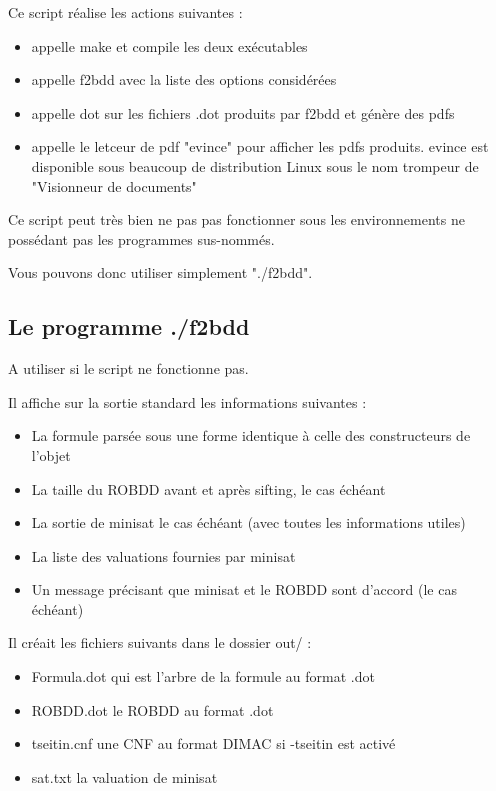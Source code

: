 \documentclass[a4paper,10pt]{article}
\begin{document}
Ce script réalise les actions suivantes :

\begin{itemize}
\item appelle make et compile les deux exécutables
\item appelle f2bdd avec la liste des options considérées
\item appelle dot sur les fichiers .dot produits par f2bdd et génère des pdfs
\item appelle le letceur de pdf "evince" pour afficher les pdfs produits. evince est disponible sous beaucoup de distribution Linux sous le nom trompeur de "Visionneur de documents"
\end{itemize}

Ce script peut très bien ne pas pas fonctionner sous les environnements ne possédant pas les programmes sus-nommés.

Vous pouvons donc utiliser simplement "./f2bdd".

\subsection{Le programme ./f2bdd}

A utiliser si le script ne fonctionne pas.

Il affiche sur la sortie standard les informations suivantes :

\begin{itemize}
\item La formule parsée sous une forme identique à celle des constructeurs de l'objet
\item La taille du ROBDD avant et après sifting, le cas échéant
\item La sortie de minisat le cas échéant (avec toutes les informations utiles)
\item La liste des valuations fournies par minisat
\item Un message précisant que minisat et le ROBDD sont d'accord (le cas échéant)
\end{itemize}

Il créait les fichiers suivants dans le dossier out/ :

\begin{itemize}
\item Formula.dot qui est l'arbre de la formule au format .dot
\item ROBDD.dot le ROBDD au format .dot
\item tseitin.cnf une CNF au format DIMAC si -tseitin est activé
\item sat.txt la valuation de minisat
\end{itemize}
\end{document}
